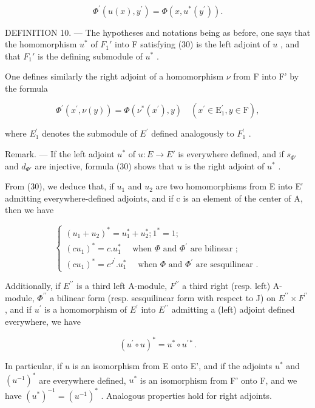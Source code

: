 \[
\Phi^ {\prime} (u (x), y ^ {\prime}) = \Phi (x, u ^ {*} (y ^ {\prime})).\tag{30}
\]

DEFINITION 10. --- The hypotheses and notations being as before, one says that the homomorphism \(u^*\) of \(F_1'\) into F satisfying (30) is the left adjoint of \(u\) , and that \(F_1'\) is the defining submodule of \(u^*\) .

One defines similarly the right adjoint of a homomorphism \(\nu\) from F into F' by the formula

\[
\Phi^ {\prime} (x ^ {\prime}, \nu (y)) = \Phi (\nu^ {*} (x ^ {\prime}), y) \quad (x ^ {\prime} \in \mathrm{E} _ {1} ^ {\prime}, y \in \mathrm{F}),\tag{31}
\]

where \(E_{1}^{\prime}\) denotes the submodule of \(E^{\prime}\) defined analogously to \(F_{1}^{\prime}\) .

Remark. --- If the left adjoint \(u^{*}\) of \(u: E \to E'\) is everywhere defined, and if \(s_{\Phi'}\) and \(d_{\Phi'}\) are injective, formula (30) shows that \(u\) is the right adjoint of \(u^{*}\) .

From (30), we deduce that, if \(u_1\) and \(u_2\) are two homomorphisms from E into E′ admitting everywhere-defined adjoints, and if c is an element of the center of A, then we have

\[
\left\{ \begin{array}{l} (u _ {1} + u _ {2}) ^ {*} = u _ {1} ^ {*} + u _ {2} ^ {*}; 1 ^ {*} = 1; \\ (c u _ {1}) ^ {*} = c. u _ {1} ^ {*} \quad \text { when } \Phi \text { and } \Phi^ {\prime} \text { are bilinear }; \\ (c u _ {1}) ^ {*} = c ^ {J ^ {\prime}}. u _ {1} ^ {*} \quad \text { when } \Phi \text { and } \Phi^ {\prime} \text { are sesquilinear }. \end{array} \right.\tag{32}
\]

Additionally, if \(E^{\prime\prime}\) is a third left A-module, \(F^{\prime\prime}\) a third right (resp. left) A-module, \(\Phi^{\prime\prime}\) a bilinear form (resp. sesquilinear form with respect to J) on \(E^{\prime\prime} \times F^{\prime\prime}\) , and if \(u^{\prime}\) is a homomorphism of \(E^{\prime}\) into \(E^{\prime\prime}\) admitting a (left) adjoint defined everywhere, we have

\[
(u ^ {\prime} \circ u) ^ {*} = u ^ {*} \circ u ^ {\prime *}.\tag{33}
\]

In particular, if \(u\) is an isomorphism from E onto E', and if the adjoints \(u^{*}\) and \((u^{-1})^{*}\) are everywhere defined, \(u^{*}\) is an isomorphism from F' onto F, and we have \((u^{*})^{-1} = (u^{-1})^{*}\) . Analogous properties hold for right adjoints.

